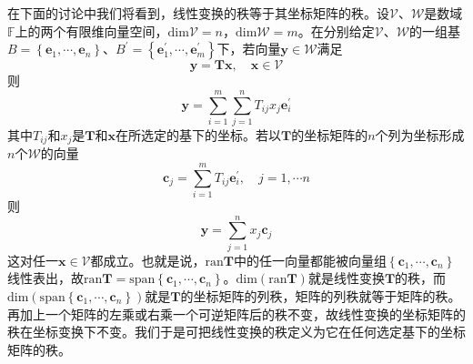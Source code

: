\documentclass[main.tex]{subfiles}
\begin{document}
在下面的讨论中我们将看到，线性变换的秩等于其坐标矩阵的秩。设$\mathcal{V}$、$\mathcal{W}$是数域$\mathbb{F}$上的两个有限维向量空间，$\mathrm{dim}\mathcal{V}=n$，$\mathrm{dim}\mathcal{W}=m$。在分别给定$\mathcal{V}$、$\mathcal{W}$的一组基$B=\left\{\mathbf{e}_1,\cdots,\mathbf{e}_n\right\}$、$B^\prime=\left\{\mathbf{e}^\prime_1,\cdots,\mathbf{e}^\prime_m\right\}$下，若向量$\mathbf{y}\in\mathcal{W}$满足
\[\mathbf{y}=\mathbf{Tx},\quad\mathbf{x}\in\mathcal{V}\]
则
\[\mathbf{y}=\sum_{i=1}^m\sum_{j=1}^nT_{ij}x_j\mathbf{e}^\prime_i\]
其中$T_{ij}$和$x_j$是$\mathbf{T}$和$\mathbf{x}$在所选定的基下的坐标。若以$\mathbf{T}$的坐标矩阵的$n$个列为坐标形成$n$个$\mathcal{W}$的向量
\[\mathbf{c}_j=\sum_{i=1}^mT_{ij}\mathbf{e}^\prime_i,\quad j=1,\cdots n\]
则
\[\mathbf{y}=\sum_{j=1}^nx_j\mathbf{c}_j\]
这对任一$\mathbf{x}\in\mathcal{V}$都成立。也就是说，$\mathrm{ran}\mathbf{T}$中的任一向量都能被向量组$\left\{\mathbf{c}_1,\cdots,\mathbf{c}_n\right\}$线性表出，故$\mathrm{ran}\mathbf{T}=\mathrm{span}\left\{\mathbf{c}_1,\cdots,\mathbf{c}_n\right\}$。$\mathrm{dim}\left(\mathrm{ran}\mathbf{T}\right)$就是线性变换$\mathbf{T}$的秩，而$\mathrm{dim}\left(\mathrm{span}\left\{\mathbf{c}_1,\cdots,\mathbf{c}_n\right\}\right)$就是$\mathbf{T}$的坐标矩阵的列秩，矩阵的列秩就等于矩阵的秩\cite[\S 4.4 定理4.3]{周胜林2012线性代数}。再加上一个矩阵的左乘或右乘一个可逆矩阵后的秩不变\cite[\S 4.4 推论4.6]{周胜林2012线性代数}，故线性变换的坐标矩阵的秩在坐标变换下不变。我们于是可把线性变换的秩定义为它在任何选定基下的坐标矩阵的秩。
\end{document}
